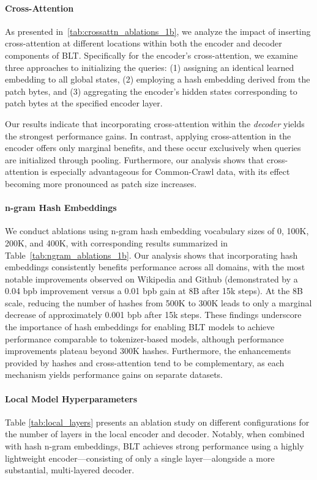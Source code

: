 \paragraph{Cross-Attention}
As presented in~\autoref{tab:crossattn_ablations_1b}, we analyze the impact of inserting cross-attention at different locations within both the encoder and decoder components of {\textsc BLT}. Specifically for the encoder's cross-attention, we examine three approaches to initializing the queries: (1) assigning an identical learned embedding to all global states, (2) employing a hash embedding derived from the patch bytes, and (3) aggregating the encoder's hidden states corresponding to patch bytes at the specified encoder layer.

Our results indicate that incorporating cross-attention within the \textit{decoder} yields the strongest performance gains. In contrast, applying cross-attention in the encoder offers only marginal benefits, and these occur exclusively when queries are initialized through pooling. Furthermore, our analysis shows that cross-attention is especially advantageous for Common-Crawl data, with its effect becoming more pronounced as patch size increases.

\paragraph{n-gram Hash Embeddings} 

We conduct ablations using n-gram hash embedding vocabulary sizes of 0, 100K, 200K, and 400K, with corresponding results summarized in Table~\ref{tab:ngram_ablations_1b}. Our analysis shows that incorporating hash embeddings consistently benefits performance across all domains, with the most notable improvements observed on Wikipedia and Github (demonstrated by a 0.04 bpb improvement versus a 0.01 bpb gain at 8B after 15k steps). At the 8B scale, reducing the number of hashes from 500K to 300K leads to only a marginal decrease of approximately 0.001 bpb after 15k steps. These findings underscore the importance of hash embeddings for enabling {\textsc BLT} models to achieve performance comparable to tokenizer-based models, although performance improvements plateau beyond 300K hashes. Furthermore, the enhancements provided by hashes and cross-attention tend to be complementary, as each mechanism yields performance gains on separate datasets.

\paragraph{Local Model Hyperparameters} Table \ref{tab:local_layers} presents an ablation study on different configurations for the number of layers in the local encoder and decoder. Notably, when combined with hash n-gram embeddings, {\textsc BLT} achieves strong performance using a highly lightweight encoder—consisting of only a single layer—alongside a more substantial, multi-layered decoder.

